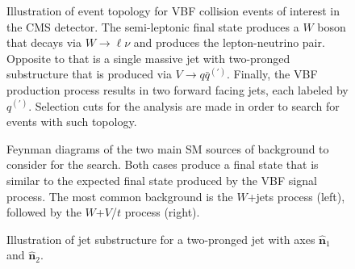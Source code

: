 \begin{figure}[htbp]
  \centering
  
  \caption{Illustration of event topology for VBF collision events of interest in the CMS detector. The semi-leptonic final state produces a $W$ boson that decays via $W\to\ell\nu$ and produces the lepton-neutrino pair. Opposite to that is a single massive jet with two-pronged substructure that is produced via $V\to q\bar{q}^{(\prime)}$. Finally, the VBF production process results in two forward facing jets, each labeled by $q^{(\prime)}$. Selection cuts for the analysis are made in order to search for events with such topology.}
  \label{fig:eventTop}
\end{figure}

\begin{figure}[htbp]
  \centering
  
  \caption{Feynman diagrams of the two main SM sources of background to consider for the search. Both cases produce a final state that is similar to the expected final state produced by the VBF signal process. The most common background is the $W$+jets process (left), followed by the $W$+$V$/$t$ process (right).}
  \label{fig:bkgFeynman}
\end{figure}

\begin{figure}[htbp]
  \centering
  
  \caption{Illustration of jet substructure for a two-pronged jet with axes $\mathbf{\hat{n}}_1$ and $\mathbf{\hat{n}}_2$.}
  \label{fig:jet}
\end{figure}
